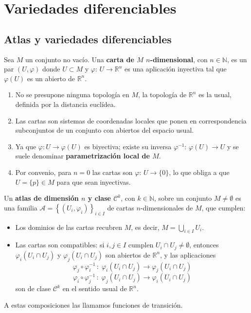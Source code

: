 \justifying
\chapter{Variedades diferenciables}
\section{Atlas y variedades diferenciables}
\begin{defi}
Sea $M$ un conjunto no vacío. Una \textbf{carta de $M$ $n$-dimensional},  con $n \in \mathbb{N}$, es un par $(U,\varphi)$ donde $U \subset M$ y $\varphi:\,U\longrightarrow\mathbb{R}^n$ es una aplicación inyectiva tal que $\varphi(U)$ es un abierto de $\mathbb{R}^n$.
\end{defi}
\begin{obs} \: 
\begin{enumerate}
    \item No se presupone ninguna topología en $M$, la topología de $\mathbb{R}^n$ es la usual, definida por la distancia euclídea.
    \item Las cartas son sistemas de coordenadas locales que ponen en correspondencia subconjuntos de un conjunto con abiertos del espacio usual.
    \item Ya que $\varphi: U \longrightarrow \varphi(U)$ es biyectiva; existe su inversa $\varphi^{-1}:\,\varphi(U)\longrightarrow U$ y se suele denominar \textbf{parametrización local de $M$}.
    \item Por convenio, para $n=0$ las cartas son $\varphi:\,U\longrightarrow\{0\}$, lo que obliga a que $U = \{p\}\in M$ para que sean inyectivas.
\end{enumerate}
\end{obs}

\begin{defi}
Un \textbf{atlas de dimensión $n$ y clase $\mathcal{C}^k$}, con $k \in \mathbb{N}$, sobre un conjunto $M \neq \emptyset$ es una familia $\mathcal{A} = \left\{(U_i,\varphi_i)\right\}_{i \in I}$ de cartas $n$-dimensionales de $M$, que cumplen:
\begin{itemize}
    \item Los dominios de las cartas recubren $M$, es decir, $M = \underset{i \in I}{\bigcup} U_i$.
    \item Las cartas son compatibles: si $i, j \in I$ cumplen $U_i \cap U_j \neq \emptyset$, entonces $\varphi_i(U_i \cap U_j)$ y $\varphi_j(U_i \cap U_j)$ son abiertos de $\mathbb{R}^n$, y las aplicaciones $$\varphi_j \circ \varphi_i^{-1}\,:\; \varphi_i(U_i \cap U_j) \longrightarrow \varphi_j(U_i \cap U_j)$$ 
    $$\varphi_i \circ \varphi_j^{-1}\,:\; \varphi_j(U_i \cap U_j) \longrightarrow \varphi_i(U_i \cap U_j)$$son de clase $\mathcal{C}^k$ en el sentido usual de $\mathbb{R}^n$.
\end{itemize}
A estas composiciones las llamamos funciones de transición.
\end{defi}

